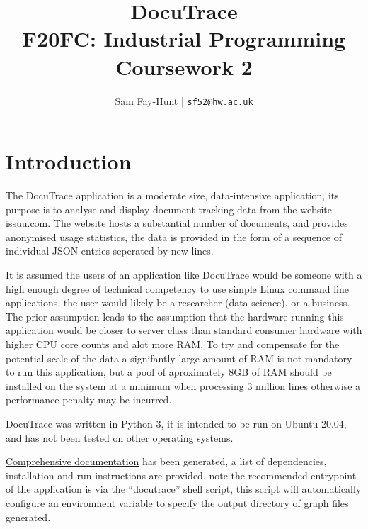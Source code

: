 \documentclass[11pt]{article}
\begin{document}
\title{%
	\bf DocuTrace\\ 
    \large F20FC: Industrial Programming\\
    Coursework 2}

\author{
	Sam Fay-Hunt | \texttt{sf52@hw.ac.uk}
}

\maketitle
\thispagestyle{empty}
\pagebreak


\tableofcontents
\thispagestyle{empty}
\pagebreak


\setcounter{page}{1}

\section{Introduction}
The DocuTrace application is a moderate size, data-intensive application, its purpose is to analyse and display document tracking data from the website \href{https://issuu.com/}{issuu.com}. 
The website hosts a substantial number of documents, and provides anonymised usage statistics, the data is provided in the form of a sequence of individual JSON entries seperated by new lines. 


It is assumed the users of an application like DocuTrace would be someone with a high enough degree of technical competency to use simple Linux command line applications, the user would likely be a researcher (data science), or a business. 
The prior assumption leads to the assumption that the hardware running this application would be closer to server class than standard consumer hardware with higher CPU core counts and alot more RAM.
To try and compensate for the potential scale of the data a signifantly large amount of RAM is not mandatory to run this application, but a pool of aproximately 8GB of RAM should be installed on the system at a minimum when processing 3 million lines otherwise a performance penalty may be incurred.


DocuTrace was written in Python 3, it is intended to be run on Ubuntu 20.04, and has not been tested on other operating systems. 

\href{https://www2.macs.hw.ac.uk/~sf52/DocuTrace/html/index.html}{Comprehensive documentation} has been generated, a list of dependencies, installation and run instructions are provided, note the recommended entrypoint of the application is via the ``docutrace'' shell script, this script will automatically configure an environment variable to specify the output directory of graph files generated.
\end{document}
